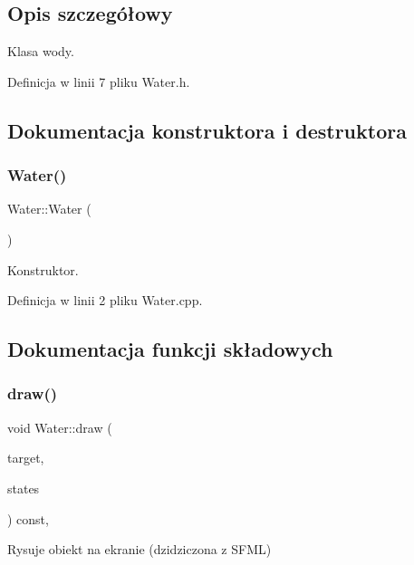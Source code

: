 \subsection{Opis szczegółowy}
Klasa wody. 

Definicja w linii 7 pliku Water.\+h.



\subsection{Dokumentacja konstruktora i destruktora}
\mbox{\label{class_water_a32d8f391b149a405008a606ceafa35ee}} 
\subsubsection{\texorpdfstring{Water()}{Water()}}
{\footnotesize\ttfamily Water\+::\+Water (\begin{DoxyParamCaption}{ }\end{DoxyParamCaption})}



Konstruktor. 



Definicja w linii 2 pliku Water.\+cpp.



\subsection{Dokumentacja funkcji składowych}
\mbox{\label{class_water_a4a929b9c339c55d6c7bcabe79349bae8}} 
\subsubsection{\texorpdfstring{draw()}{draw()}}
{\footnotesize\ttfamily void Water\+::draw (\begin{DoxyParamCaption}\item[{sf\+::\+Render\+Target \&}]{target,  }\item[{sf\+::\+Render\+States}]{states }\end{DoxyParamCaption}) const\hspace{0.3cm}{\ttfamily [override]}, {\ttfamily [protected]}}



Rysuje obiekt na ekranie (dzidziczona z S\+F\+ML) 


